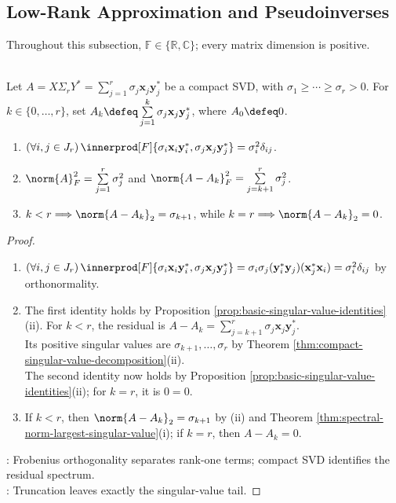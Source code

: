\subsection{Low-Rank Approximation and Pseudoinverses}

Throughout this subsection, $\mathbb{F}\in\{\mathbb{R},\mathbb{C}\}$; every matrix dimension is positive.

\begin{proposition} \label{prop:rank-one-svd-orthogonality-and-truncation-error} \\
Let $A=X\Sigma_rY^*=\sum\limits_{j=1}^{r}\sigma_j\mathbf{x}_j\mathbf{y}_j^*$ be a compact SVD, with $\sigma_1\geq\cdots\geq\sigma_r>0$. For $k\in\{0,\ldots,r\}$, set $A_k\defeq\sum\limits_{j=1}^{k}\sigma_j\mathbf{x}_j\mathbf{y}_j^*$, where $A_0\defeq0$.
\begin{enumerate}[label=(\roman*)]
\setlength{\itemsep}{0pt}
\item $(\forall i,j\in J_r)\,\innerprod[F]{\sigma_i\mathbf{x}_i\mathbf{y}_i^*,\sigma_j\mathbf{x}_j\mathbf{y}_j^*}=\sigma_i^2\delta_{ij}$.
\item $\norm{A}_F^2=\sum\limits_{j=1}^{r}\sigma_j^2$ and $\norm{A-A_k}_F^2=\sum\limits_{j=k+1}^{r}\sigma_j^2$.
\item $k<r\Longrightarrow\norm{A-A_k}_2=\sigma_{k+1}$, while $k=r\Longrightarrow\norm{A-A_k}_2=0$.
\end{enumerate}
\begin{proof}
\begin{enumerate}[label=(\roman*)]
\setlength{\itemsep}{0pt}
\item $(\forall i,j\in J_r)\,\innerprod[F]{\sigma_i\mathbf{x}_i\mathbf{y}_i^*,\sigma_j\mathbf{x}_j\mathbf{y}_j^*}=\sigma_i\sigma_j(\mathbf{y}_i^*\mathbf{y}_j)(\mathbf{x}_j^*\mathbf{x}_i)=\sigma_i^2\delta_{ij}$ by orthonormality.
\item The first identity holds by Proposition \ref{prop:basic-singular-value-identities}(ii). For $k<r$, the residual is $A-A_k=\sum\limits_{j=k+1}^{r}\sigma_j\mathbf{x}_j\mathbf{y}_j^*$.\\
Its positive singular values are $\sigma_{k+1},\ldots,\sigma_r$ by Theorem \ref{thm:compact-singular-value-decomposition}(ii).\\
The second identity now holds by Proposition \ref{prop:basic-singular-value-identities}(ii); for $k=r$, it is $0=0$.
\item If $k<r$, then $\norm{A-A_k}_2=\sigma_{k+1}$ by (ii) and Theorem \ref{thm:spectral-norm-largest-singular-value}(i); if $k=r$, then $A-A_k=0$.
\end{enumerate}
: Frobenius orthogonality separates rank-one terms; compact SVD identifies the residual spectrum.\\
: Truncation leaves exactly the singular-value tail.
\end{proof}
\end{proposition}

